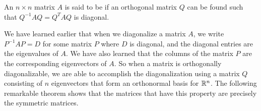 \documentclass{ximera}
\begin{document}
\begin{definition}\label{def:orthDiag}
An $n \times n$ matrix $A$ is said to be  if an orthogonal matrix $Q$ can be found such that  $Q^{-1}AQ = Q^{T}AQ$ is diagonal.
\end{definition}

We have learned earlier that when we diagonalize a matrix $A$, we write $P^{-1}AP=D$ for some matrix $P$ where $D$ is diagonal, and the diagonal entries are the eigenvalues of $A$.  We have also learned that the columns of the matrix $P$ are the corresponding eigenvectors of $A$.  So when a matrix is orthogonally diagonalizable, we are able to accomplish the diagonalization using a matrix $Q$ consisting of $n$ eigenvectors that form an orthonormal basis for $\mathbb{R}^n$.  The following remarkable theorem shows that the matrices that have this property are precisely the symmetric matrices.
\end{document}
